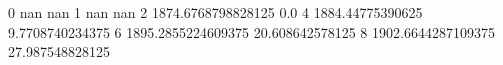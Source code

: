 0 nan nan
1 nan nan
2 1874.6768798828125 0.0
4 1884.44775390625 9.7708740234375
6 1895.2855224609375 20.608642578125
8 1902.6644287109375 27.987548828125
